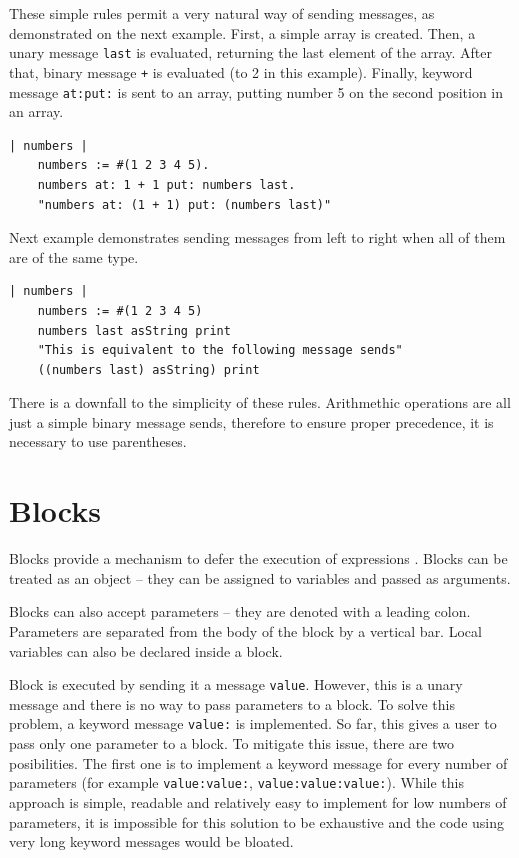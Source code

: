 \documentclass[thesis=M,english]{FITthesis}[2019/12/23]
\begin{document}
These simple rules permit a very natural way of sending messages, as demonstrated on the next example.
First, a simple array is created. Then, a unary message \texttt{last} is evaluated, returning the last
element of the array. After that, binary message \texttt{+} is evaluated (to 2 in this example). Finally,
keyword message \texttt{at:put:} is sent to an array, putting number 5 on the second position in an array.
\begin{lstlisting}[language=Smalltalk]
	| numbers |
	numbers := #(1 2 3 4 5).
	numbers at: 1 + 1 put: numbers last.
	"numbers at: (1 + 1) put: (numbers last)"
\end{lstlisting}

Next example demonstrates sending messages from left to right when all of them are of the same type.
\begin{lstlisting}[language=Smalltalk]
	| numbers |
	numbers := #(1 2 3 4 5)
	numbers last asString print
	"This is equivalent to the following message sends"
	((numbers last) asString) print
\end{lstlisting}

There is a downfall to the simplicity of these rules. Arithmethic operations are all just a simple binary
message sends, therefore to ensure proper precedence, it is necessary to use parentheses.

\section{Blocks}
Blocks provide a mechanism to defer the execution of expressions \cite{pharo-by-example}.
Blocks can be treated as an object -- they can be assigned to variables and
passed as arguments. 

Blocks can also accept parameters -- they are denoted with a leading colon. Parameters are separated from the body
of the block by a vertical bar. Local variables can also be declared inside a block.

Block is executed by sending it a message \texttt{value}. However, this is a unary message and there is no way
to pass parameters to a block. To solve this problem, a keyword message \texttt{value:} is implemented. So far, this
gives a user to pass only one parameter to a block. To mitigate this issue, there are two posibilities. The first one
is to implement a keyword message for every number of parameters (for example \texttt{value:value:}, 
\texttt{value:value:value:}). While this approach is simple, readable and relatively easy to implement for low
numbers of parameters, it is impossible for this solution to be exhaustive and the code using very long keyword
messages would be bloated.
\end{document}
